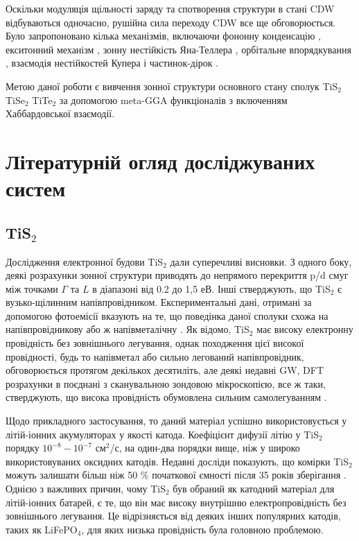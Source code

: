 Оскільки модуляція щільності заряду та спотворення структури в стані CDW відбуваються одночасно, рушійна сила переходу CDW все ще обговорюється. Було запропоновано кілька механізмів, включаючи фононну конденсацію \cite{PhysRevLett.86.3799}, екситонний механізм \cite{PhysRevLett.106.106404}, зонну нестійкість Яна-Теллера \cite{doi:10.1143/JPSJ.49.898}, орбітальне впорядкування \cite{PhysRevLett.107.176404}, взаємодія нестійкостей Купера і частинок-дірок \cite{PhysRevLett.113.177001}.

Метою даної роботи є вивчення зонної структури основного стану сполук TiS$_2$ TiSe$_2$ TiTe$_2$ за допомогою meta-GGA функціоналів з включенням Хаббардовської взаємодії. 

\section{Літературній огляд досліджуваних систем}
\subsection{TiS$_2$}
Дослідження електронної будови TiS$_{2}$ дали суперечливі висновки. З одного боку, деякі розрахунки зонної структури приводять до непрямого перекриття p/d смуг між точками $\Gamma$ та $L$ в діапазоні від 0.2 до 1,5 еВ. Інші стверджують, що TiS$_{2}$ є вузько-щілинним напівпровідником. Експериментальні дані, отримані за допомогою фотоемісії вказують на те, що поведінка даної сполуки схожа на напівпровідникову \cite{semiconducter} або ж напівметалічну \cite{semimetal}. Як відомо, TiS$_{2}$ має високу електронну провідність без зовнішнього легування, однак походження цієї високої провідності, будь то напівметал або сильно легований напівпровідник, обговорюється протягом декількох десятиліть, але деякі недавні GW, DFT розрахунки в поєднані з сканувальною зондовою мікроскопією, все ж таки, стверджують, що висока провідність обумовлена сильним самолегуванням \cite{semimetal_or_semiconducter}. 

Щодо прикладного застосування, то даний матеріал успішно використовується у літій-іонних акумуляторах у якості катода. Коефіцієнт дифузії літію у TiS$_2$ порядку $10^{-8}-10^{-7}$ см$^2$/с, на один-два порядки вище, ніж у широко використовуваних оксидних катодів. Недавні досліди показують, що комірки TiS$_2$ можуть залишати більш ніж 50 \% початкової ємності після 35 років зберігання \cite{2015JPS...280...18P}. Однією з важливих причин, чому TiS$_2$ був обраний як катодний матеріал для літій-іонних батарей, є те, що він має високу внутрішню електропровідність без зовнішнього легування. Це відрізняється від деяких інших популярних катодів, таких як LiFePO$_4$, для яких низька провідність була головною проблемою.


